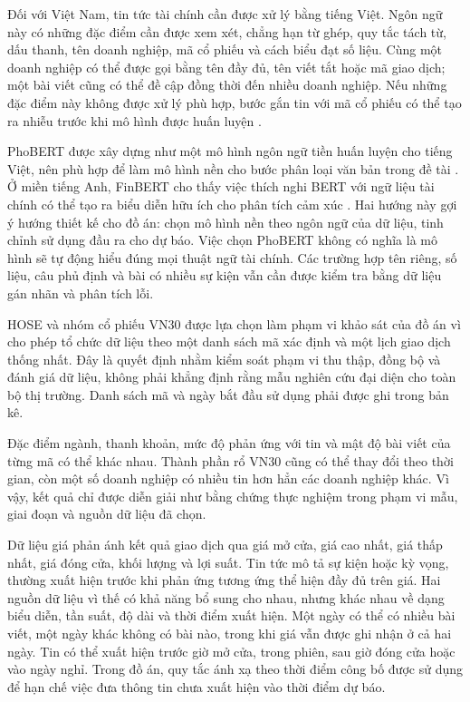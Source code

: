 Đối với Việt Nam, tin tức tài chính cần được xử lý bằng tiếng Việt. Ngôn ngữ này
có những đặc điểm cần được xem xét, chẳng hạn từ ghép, quy tắc tách từ, dấu thanh, tên
doanh nghiệp, mã cổ phiếu và cách biểu đạt số liệu. Cùng một doanh nghiệp có thể được
gọi bằng tên đầy đủ, tên viết tắt hoặc mã giao dịch; một bài viết cũng có thể đề cập
đồng thời đến nhiều doanh nghiệp. Nếu những đặc điểm này không được xử lý phù hợp, bước
gắn tin với mã cổ phiếu có thể tạo ra nhiễu trước khi mô hình được huấn luyện
\cite{Nguyen2020_200300744v3}.

PhoBERT được xây dựng như một mô hình ngôn ngữ tiền huấn luyện cho tiếng Việt, nên phù
hợp để làm mô hình nền cho bước phân loại văn bản trong đề tài \cite{Nguyen2020_200300744v3}.
Ở miền tiếng Anh, FinBERT cho thấy việc thích nghi BERT với ngữ liệu tài chính có thể
tạo ra biểu diễn hữu ích cho phân tích cảm xúc \cite{Yang2020_200608097v2}. Hai hướng
này gợi ý hướng thiết kế cho đồ án: chọn mô hình nền theo ngôn ngữ của dữ liệu, tinh chỉnh
sử dụng đầu ra cho dự báo. Việc chọn PhoBERT không có nghĩa là mô hình sẽ tự động hiểu
đúng mọi thuật ngữ tài chính. Các trường hợp tên riêng, số liệu, câu phủ định và bài có
nhiều sự kiện vẫn cần được kiểm tra bằng dữ liệu gán nhãn và phân tích lỗi.

HOSE và nhóm cổ phiếu VN30 được lựa chọn làm phạm vi khảo sát của đồ án vì cho phép
tổ chức dữ liệu theo một danh sách mã xác định và một lịch giao dịch thống nhất. Đây là
quyết định nhằm kiểm soát phạm vi thu thập, đồng bộ và đánh giá dữ liệu, không phải
khẳng định rằng mẫu nghiên cứu đại diện cho toàn bộ thị trường. Danh sách mã và ngày bắt
đầu sử dụng phải được ghi trong bản kê.

Đặc điểm ngành, thanh khoản,
mức độ phản ứng với tin và mật độ bài viết của từng mã có thể khác nhau. Thành phần rổ
VN30 cũng có thể thay đổi theo thời gian, còn một số doanh nghiệp có nhiều tin hơn hẳn
các doanh nghiệp khác. Vì vậy, kết quả chỉ được diễn giải như bằng chứng thực nghiệm
trong phạm vi mẫu, giai đoạn và nguồn dữ liệu đã chọn.

Dữ liệu giá phản ánh kết quả giao dịch qua giá mở cửa, giá cao nhất, giá thấp nhất, giá
đóng cửa, khối lượng và lợi suất. Tin tức mô tả sự kiện hoặc kỳ vọng, thường xuất
hiện trước khi phản ứng tương ứng thể hiện đầy đủ trên giá. Hai nguồn dữ liệu vì thế có khả
năng bổ sung cho nhau, nhưng khác nhau về dạng biểu diễn, tần suất, độ dài và thời điểm
xuất hiện. Một ngày có thể có nhiều bài viết, một ngày khác không có bài nào, trong khi
giá vẫn được ghi nhận ở cả hai ngày. Tin có thể xuất hiện trước giờ mở cửa, trong phiên,
sau giờ đóng cửa hoặc vào ngày nghỉ. Trong đồ án, quy tắc ánh xạ theo thời điểm công bố
được sử dụng để hạn chế việc đưa thông tin chưa xuất hiện vào thời điểm dự báo.

